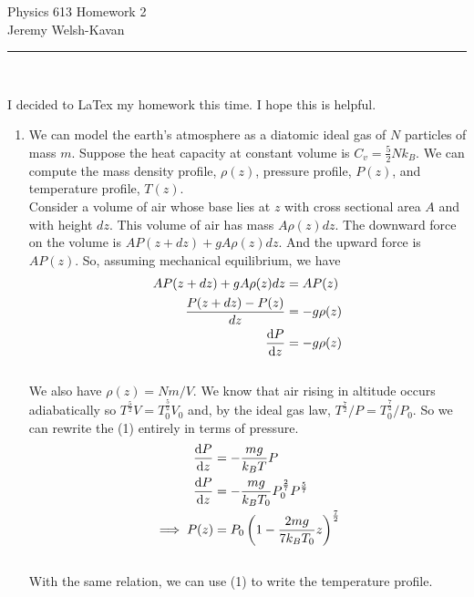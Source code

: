 \documentclass[]{book}
\begin{document}
\begin{center}
{\Large Physics 613 Homework 2}\\
{Jeremy Welsh-Kavan}\\
\end{center}
\vspace{0.2 cm}
\begin{center}
\noindent\rule{15cm}{0.4pt} \\
\end{center}
I decided to LaTex my homework this time. I hope this is helpful.
\begin{enumerate}[1)]
\item
We can model the earth's atmosphere as a diatomic ideal gas of $N$ particles of mass $m$. Suppose the heat capacity at constant volume is $C_v = \frac{5}{2}Nk_B$. We can compute the mass density profile, $\rho(z)$, pressure profile, $P(z)$, and temperature profile, $T(z)$. \\
Consider a volume of air whose base lies at $z$ with cross sectional area $A$ and with height $dz$. This volume of air has mass $A\rho(z)dz$. The downward force on the volume is $AP(z+dz) + gA\rho(z)dz$. And the upward force is $AP(z)$. So, assuming mechanical equilibrium, we have
\begin{equation}
\begin{split}
AP(z+dz) + gA\rho(z)dz & = AP(z)\\ 
\frac{P(z+dz) - P(z)}{dz} & = -g\rho(z) \\ 
\dv{P}{z} &  = -g\rho(z) \\ 
 \end{split}
\end{equation} \\
We also have $\rho(z) = Nm/V$. We know that air rising in altitude occurs adiabatically so $T^\frac{5}{2}V =T_0^\frac{5}{2}V _0$ and, by the ideal gas law, $T^\frac{7}{2}/P = T_0^\frac{7}{2}/P_0$. So we can rewrite the (1) entirely in terms of pressure. 
\begin{equation}
\begin{split}
\dv{P}{z} &  = -\frac{mg}{k_BT} P \\ 
\dv{P}{z} &  = -\frac{mg}{k_BT_0} P_0^\frac{2}{7} P^\frac{5}{7}  \\ 
\implies P(z) & = P_0 \left( 1 - \frac{2mg}{7k_BT_0}z\right)^\frac{7}{2} \\
 \end{split}
\end{equation} \\
With the same relation, we can use (1) to write the temperature profile. 

\end{enumerate}
\end{document}
